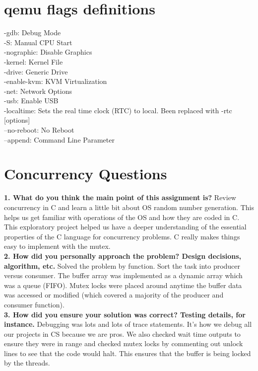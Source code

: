 \documentclass[10pt,english]{article}
\begin{document}
\section{qemu flags definitions}


-gdb: Debug Mode                          \\
-S: Manual CPU Start                      \\
-nographic: Disable Graphics              \\
-kernel: Kernel File                      \\
-drive: Generic Drive                     \\
-enable-kvm: KVM Virtualization           \\
-net: Network Options                     \\
-usb: Enable USB                          \\
-localtime: Sets the real time clock (RTC) to local. Been replaced with -rtc [options] \\
--no-reboot: No Reboot                                                                 \\
--append: Command Line Parameter                                                       \\

\section{Concurrency Questions}

\textbf{1. What do you think the main point of this assignment is?}
Review concurrency in C and learn a little bit about OS random number generation. This helps us get familiar with operations of the OS and how they are coded in C. This exploratory project helped us have a deeper understanding of the essential properties of the C language for concurrency problems. C really makes things easy to implement with the mutex. \\


\noindent \textbf{2. How did you personally approach the problem? Design decisions, algorithm, etc.}
Solved the problem by function. Sort the task into producer versus consumer. The buffer array was implemented as a dynamic array which was a queue (FIFO). Mutex locks were placed around anytime the buffer data was accessed or modified (which covered a majority of the producer and consumer function).  \\


\noindent \textbf{3. How did you ensure your solution was correct? Testing details, for instance.}
Debugging was lots and lots of trace statements. It's how we debug all our projects in CS because we are pros. We also checked wait time outputs to ensure they were in range and checked mutex locks by commenting out unlock lines to see that the code would halt. This ensures that the buffer is being locked by the threads.\\
\end{document}
